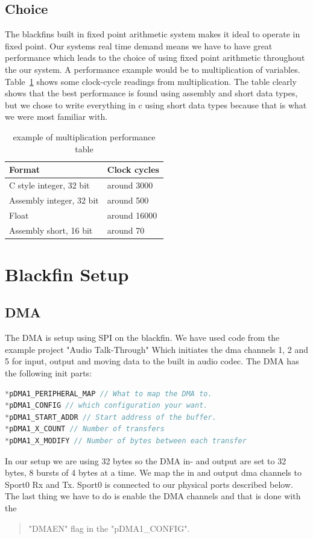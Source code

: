 \subsection{Choice}
The blackfins built in fixed point arithmetic system makes it ideal to operate in fixed point. Our systems real time demand means we have to have great performance which leads to the choice of using fixed point arithmetic throughout the our system. A performance example would be to multiplication of variables. Table~\ref{tab:performance} shows some clock-cycle readings from multiplication. The table clearly shows that the best performance is found using assembly and short data types, but we chose to write everything in c using short data types because that is what we were most familiar with.
\begin{table}[hbtp]
	\centering
    \begin{tabular}{| p{4.5cm} | p{2.5cm} |}
    \hline
    Format                   & Clock cycles \\ \hline
    C style integer, 32 bit  & around 3000  \\ \hline
    Assembly integer, 32 bit & around 500   \\ \hline
    Float                    & around 16000 \\ \hline
    Assembly short, 16 bit   & around 70    \\ \hline
    \end{tabular}
    \caption{example of multiplication performance table}
    \label{tab:performance}
\end{table}

\section{Blackfin Setup}
\subsection{DMA}
The DMA is setup using SPI on the blackfin. We have used code from the example project "Audio Talk-Through" Which initiates the dma channels 1, 2 and 5 for input, output and moving data to the built in audio codec. The DMA has the following init parts:
\begin{lstlisting}[language=C]
*pDMA1_PERIPHERAL_MAP // What to map the DMA to.
*pDMA1_CONFIG // which configuration your want.
*pDMA1_START_ADDR // Start address of the buffer.
*pDMA1_X_COUNT // Number of transfers
*pDMA1_X_MODIFY // Number of bytes between each transfer
\end{lstlisting}
In our setup we are using 32 bytes so the DMA in- and output are set to 32 bytes, 8 bursts of 4 bytes at a time. We map the in and output dma channels to Sport0 Rx and Tx. Sport0 is connected to our physical ports described below. The last thing we have to do is enable the DMA channels and that is done with the \begin{quote}
"DMAEN" flag in the "pDMA1\_CONFIG".
\end{quote}
